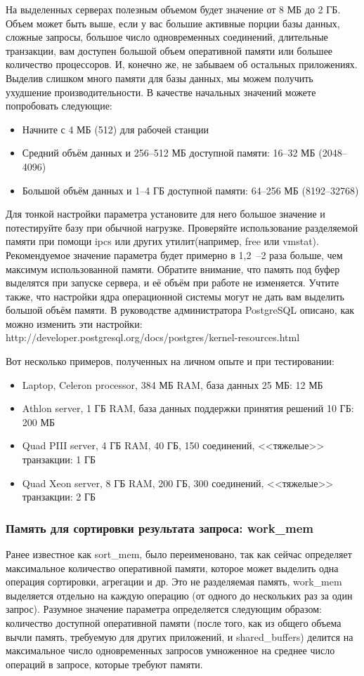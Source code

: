 На выделенных серверах полезным объемом будет значение от 8 МБ до 2 ГБ. 
Объем может быть выше, если у вас большие активные порции базы данных, сложные запросы, большое число 
одновременных соединений, длительные транзакции, вам доступен большой объем оперативной памяти или большее количество 
процессоров. И, конечно же, не забываем об остальных приложениях. Выделив слишком много памяти для базы данных, 
мы можем получить ухудшение производительности. 
В качестве начальных значений можете попробовать следующие:
\begin{itemize}
\item Начните с 4 МБ (512) для рабочей станции
\item Средний объём данных и 256--512 МБ доступной памяти: 16--32 МБ (2048--4096)
\item Большой объём данных и 1--4 ГБ доступной памяти: 64--256 МБ (8192--32768)
\end{itemize}

Для тонкой настройки параметра установите для него большое значение и потестируйте базу при обычной нагрузке. 
Проверяйте использование разделяемой памяти при помощи ipcs или других утилит(например, free или vmstat). 
Рекомендуемое значение параметра 
будет примерно в 1,2~--2 раза больше, чем максимум использованной памяти. Обратите внимание, что память под буфер 
выделятся при запуске сервера, и её объём при работе не изменяется. Учтите также, что настройки ядра операционной 
системы могут не дать вам выделить большой объём памяти. В руководстве администратора PostgreSQL описано, как 
можно изменить эти настройки: \\http://developer.postgresql.org/docs/postgres/kernel-resources.html

Вот несколько примеров, полученных на личном опыте и при тестировании:
\begin{itemize}
\item Laptop, Celeron processor, 384 МБ RAM, база данных 25 МБ: 12 МБ
\item Athlon server, 1 ГБ RAM, база данных поддержки принятия решений 10 ГБ: 200 МБ
\item Quad PIII server, 4 ГБ RAM, 40 ГБ, 150 соединений, <<тяжелые>> транзакции: 1 ГБ
\item Quad Xeon server, 8 ГБ RAM, 200 ГБ, 300 соединений, <<тяжелые>> транзакции: 2 ГБ
\end{itemize}

\subsubsection{Память для сортировки результата запроса: work\_mem}
Ранее известное как sort\_mem, было переименовано, так как сейчас определяет максимальное количество оперативной памяти, 
которое может выделить одна операция сортировки, агрегации и др. Это не разделяемая память, work\_mem выделяется отдельно 
на каждую операцию (от одного до нескольких раз за один запрос). Разумное значение параметра определяется следующим образом: 
количество доступной оперативной памяти (после того, как из общего объема вычли память, требуемую для других приложений, и 
shared\_buffers) делится на максимальное число одновременных запросов умноженное на среднее число операций в запросе, которые 
требуют памяти.

